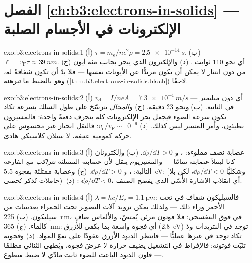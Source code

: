 \section*{الفصل \ref{ch:b3:electrons-in-solids} --- الإلكترونات في الأجسام الصلبة}

\begin{solution}{exo:b3:electrons-in-solids:1}
(أ) $\tau = m_{\text{e}}/ne^2\rho = \qty{2.5e-14}{s}$. (ب) $\ell =
v_{\text{F}}\tau \approx \qty{39}{nm}$. (ج) أي نحو 110 ثوابت
. (د) والإلكترون الذي يبحر بجانب مئة أيون من دون
انتثار لا يمكن أن يكون مرتدًّا عن الأيونات نفسها --- فلا بدّ أن تكون
 شفافةً له، وهو بالضبط ما تبرهنه 
(\cref{thm:b3:electrons-in-solids:bloch}) لاحقًا.
\end{solution}

\begin{solution}{exo:b3:electrons-in-solids:2}
(أ) $v_{\text{d}} = I/neA = \qty{7.3e-4}{m/s}$ --- أي دون
ميليمتر في الثانية. (ب) ونحو 23 دقيقة. (ج) و\emph{المجال}
يترسّخ على طول السلك بسرعة تكاد تكون سرعة الضوء فيجعل
بحر الإلكترونات كله ينجرف دفعةً واحدة: فالمسيرون بطيئون،
وأمر المسير ليس كذلك. (د) $v_{\text{d}}/v_{\text{F}} \sim
10^{-9}$: فالنقل انحياز غير محسوس على حركة
كمومية عنيفة، لا سيلان كلاسيكي هادئ.
\end{solution}

\begin{solution}{exo:b3:electrons-in-solids:3}
(أ) عصابة نصف مملوءة: ، و $\dd\rho/\dd T > 0$. (ب) وإلكترونان
كانا ليملآ عصابته تمامًا --- والمغنيزيوم ينقل
لأن عصابته الممتلئة \emph{تتراكب} مع الفارغة التالية: ، و
$\dd\rho/\dd T > 0$. (ج) وعصابة ممتلئة بفجوة \qty{5.5}{eV}: 
(وشكليًّا $\dd\rho/\dd T < 0$، لكن بلا حاملات تُذكر
تُحصى). (د) : $\dd\rho/\dd T < 0$، أي
انقلاب الإشارة الأُسّي الذي يفضح الصنف.
\end{solution}

\begin{solution}{exo:b3:electrons-in-solids:4}
(أ) $\lambda = hc/E_{\text{g}} = \qty{1.1}{\micro m}$: فالسيليكون
شفاف في تحت الأحمر وراء ذلك --- ولذلك يمكن تزويد آلات التصوير
تحت الحمراء بعدسات من سيليكون. (ب) \qty{225}{nm}، في
فوق البنفسجي: فلا فوتون مرئي يُمتصّ، والألماس
صافٍ كالماء. (ج) \qty{365}{nm}: أي فجوة واسعة بما يكفي للأزرق
(\qty{2.8}{eV}) توجد في النتريدات ولا تكاد توجد في غيرها
عمليًّا --- فانتظر الديود الأزرق عقودًا على نموّ المواد.
(د) وفجوته تثبّت فوتونه: فالإفراط في التشغيل يضيف حرارة لا عرضَ
فجوة، ويُطهى الثنائي مظلمًا --- فلون الديود الباعث للضوء
ثابت مادّي لا ضبط سطوع.
\end{solution}

